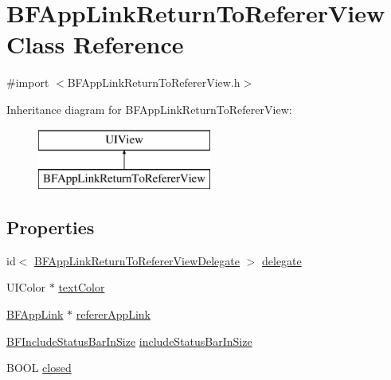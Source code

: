 \hypertarget{interface_b_f_app_link_return_to_referer_view}{}\section{B\+F\+App\+Link\+Return\+To\+Referer\+View Class Reference}
\label{interface_b_f_app_link_return_to_referer_view}


{\ttfamily \#import $<$B\+F\+App\+Link\+Return\+To\+Referer\+View.\+h$>$}

Inheritance diagram for B\+F\+App\+Link\+Return\+To\+Referer\+View\+:\begin{figure}[H]
\begin{center}
\leavevmode
\includegraphics[height=2.000000cm]{interface_b_f_app_link_return_to_referer_view}
\end{center}
\end{figure}
\subsection*{Properties}
\begin{DoxyCompactItemize}
\item 
id$<$ \hyperlink{protocol_b_f_app_link_return_to_referer_view_delegate-p}{B\+F\+App\+Link\+Return\+To\+Referer\+View\+Delegate} $>$ \hyperlink{interface_b_f_app_link_return_to_referer_view_aca2022c4be7763b7450d2a39df24b95a}{delegate}
\item 
U\+I\+Color $\ast$ \hyperlink{interface_b_f_app_link_return_to_referer_view_acef579105c567f8f22a2604ea388a37b}{text\+Color}
\item 
\hyperlink{interface_b_f_app_link}{B\+F\+App\+Link} $\ast$ \hyperlink{interface_b_f_app_link_return_to_referer_view_ab4a55f394888bd423c01532a9c6dafef}{referer\+App\+Link}
\item 
\hyperlink{_b_f_app_link_return_to_referer_view_8h_a539706a05423a101f641b3f7648314b3}{B\+F\+Include\+Status\+Bar\+In\+Size} \hyperlink{interface_b_f_app_link_return_to_referer_view_a640b53f5c49f1bfb5f11a81a8f7381af}{include\+Status\+Bar\+In\+Size}
\item 
B\+O\+O\+L \hyperlink{interface_b_f_app_link_return_to_referer_view_acb041d67e8a2f626ae99a788aa8d1da4}{closed}
\end{DoxyCompactItemize}


